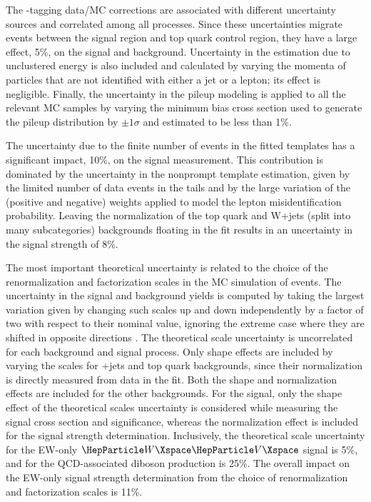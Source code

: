 The {\PQb}-tagging data/MC corrections are associated with different uncertainty sources and correlated among all
processes.  Since these uncertainties migrate events between the signal region and top quark control region, they have a
large effect, 5\%, on the signal and background.  Uncertainty in the \ptmiss estimation due to unclustered energy is
also included and calculated by varying the momenta of particles that are not identified with either a jet or a lepton;
its effect is negligible.  Finally, the uncertainty in the pileup modeling is applied to all the relevant MC samples by
varying the minimum bias cross section used to generate the pileup distribution by $\pm 1\sigma$ \cite{CMS:2018mlc} and
estimated to be less than 1\%.

The uncertainty due to the finite number of events in the fitted templates has a significant impact, 10\%, on the signal
measurement. This contribution is dominated by the uncertainty in the nonprompt template estimation, given by the
limited number of data events in the tails and by the large variation of the (positive and negative) weights applied to
model the lepton misidentification probability. Leaving the normalization of the top quark and W+jets (split into many
subcategories) backgrounds floating in the fit results in an uncertainty in the signal strength of 8\%.


The most important theoretical uncertainty is related to the choice of the renormalization and factorization scales in
the MC simulation of events.  The uncertainty in the signal and background yields is computed by taking the largest
variation given by changing such scales up and down independently by a factor of two with respect to their nominal
value, ignoring the extreme case where they are shifted in opposite directions \cite{Cacciari:2003fi,Catani:2003zt}.
The theoretical scale uncertainty is uncorrelated for each background and signal process.  Only shape effects are
included by varying the scales for {\PW}+jets and top quark backgrounds, since their normalization is directly measured
from data in the fit.  Both the shape and normalization effects are included for the other backgrounds.  For the signal,
only the shape effect of the theoretical scales uncertainty is considered while measuring the signal cross section and
significance, whereas the normalization effect is included for the signal strength determination.  Inclusively, the
theoretical scale uncertainty for the EW-only $\PW\PV$ signal is 5\%, and for the QCD-associated diboson production is
25\%.  The overall impact on the EW-only signal strength determination from the choice of renormalization and
factorization scales is 11\%.


